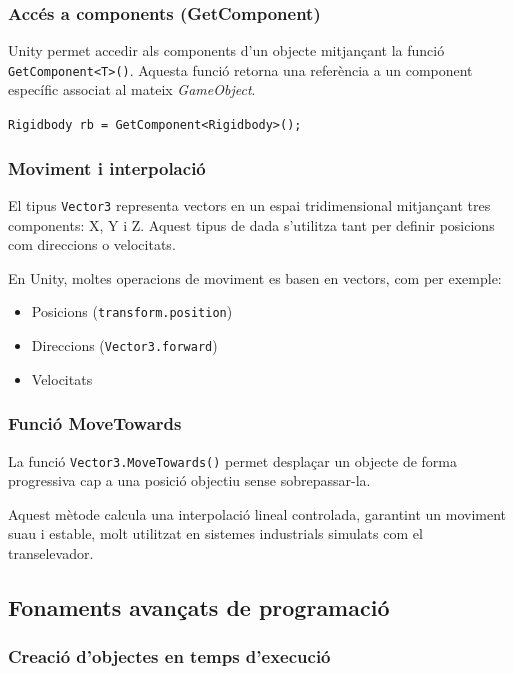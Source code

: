 \documentclass[a4paper,11pt,DIV=13,headings=normal,abstract=true,twoside=semi]{article}
\begin{document}
\subsubsection{Accés a components (GetComponent)}

Unity permet accedir als components \cite{UnityComponents} d'un objecte mitjançant la funció \texttt{GetComponent<T>()}. Aquesta funció retorna una referència a un component específic associat al mateix \textit{GameObject}.

\texttt{Rigidbody rb = GetComponent<Rigidbody>();}

\subsubsection{Moviment i interpolació}

El tipus \texttt{Vector3} representa vectors en un espai tridimensional mitjançant tres components: X, Y i Z. Aquest tipus de dada s'utilitza tant per definir posicions com direccions o velocitats.

En Unity, moltes operacions de moviment es basen en vectors, com per exemple:

\begin{itemize}
\item Posicions (\texttt{transform.position})
\item Direccions (\texttt{Vector3.forward})
\item Velocitats
\end{itemize}

\subsubsection*{Funció MoveTowards}

La funció \texttt{Vector3.MoveTowards()} permet desplaçar un objecte de forma progressiva cap a una posició objectiu sense sobrepassar-la.


Aquest mètode calcula una interpolació lineal controlada, garantint un moviment suau i estable, molt utilitzat en sistemes industrials simulats com el transelevador.


\subsection{Fonaments avançats de programació}

\subsubsection{Creació d'objectes en temps d'execució}
\end{document}
